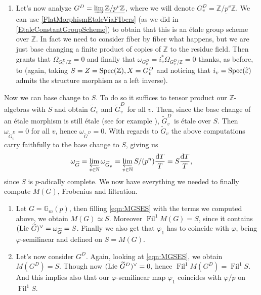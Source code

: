 \begin{ex}[]
\begin{enumerate}
	\item Let's now analyze $G^D = \varinjlim \underline{\mathbb{Z}/p^v\mathbb{Z}}$, where
		we will denote $G_v^D = \underline{\mathbb{Z}/p^v\mathbb{Z}}$.
		We can use \cref{FlatMorphismEtaleViaFIbers} (as we did in
		\cref{EtaleConstantGroupScheme}) to obtain that this is an étale
		group scheme over $\mathbb{Z}$.
		In fact we need to consider fiber by fiber what happens, but we are
		just base changing a finite product of copies of $\mathbb{Z}$ to the
		residue field.
		Then \cite[\href{https://stacks.math.columbia.edu/tag/00U0}{Section 00U0}]{SP}
		grants that $\Omega_{G_v^D/\mathbb{Z}} = 0$
		and finally that $\omega_{G_v^D} = i^*_v \Omega_{G^D_v/\mathbb{Z}} = 0$ thanks,
		as before, to
		\cite[\href{https://stacks.math.columbia.edu/tag/0474}{Lemma 0474}]{SP}
		(again, taking $S = Z = \operatorname{Spec}(\mathbb{Z}), X = G_v^D$
		and noticing that $i_v = \operatorname{Spec}(\widetilde{\varepsilon})$ admits the structure morphism
		as a left inverse).
\end{enumerate}
	Now we can base change to $S$.
	To do so it suffices to tensor product our $\mathbb{Z}$-algebras
	with $S$ and obtain $\widetilde{G}_v$ and $\widetilde{G}_v^D$ for all $v$.
	Then, since the base change of an étale morphism is still étale (see for example
	\cite[\href{https://stacks.math.columbia.edu/tag/02GO}{Lemma 02GO}]{SP}),
	$\widetilde{G}_v^D$ is étale over $S$.
	Then $\omega_{\widetilde{G}_v^D} = 0$ for all $v$,
	hence $\omega_{\widetilde{G}^D} = 0$.
	With regards to $\widetilde{G}_v$ the above computations carry faithfully
	to the base change to $S$, giving us
	\begin{equation*}
	\omega_{\widetilde{G}} = \varprojlim_{v \in \mathbb{N}} \omega_{\widetilde{G}_v} =
	\varprojlim_{v \in \mathbb{N}} S/ (p^n) \frac{ \mathrm{d}T }{ T } = S \frac{ \mathrm{d}T }{ T }
	,\end{equation*}
	since $S$ is $p$-adically complete.
	We now have everything we needed to finally compute $M(G)$, Frobenius and filtration.
\begin{enumerate}
	\item Let $G = \mathbb{G}_m(p)$, then filling \cref{eqn:MGSES} with
		the terms we computed above, we obtain $M(G) \simeq S$.
		Moreover $\operatorname{Fil}^1 M(G) = S$, since it contains
		$(\operatorname{Lie}\, \widetilde{G})^\vee = \omega_{\widetilde{G}} = S$.
		Finally we also get that $\varphi_1$ has to coincide with $\varphi$,
		being $\varphi$-semilinear and defined on $S = M(G)$.

	\item Let's now consider $G^D$.
		Again, looking at \cref{eqn:MGSES}, we obtain $M(G^D) = S$.
		Though now $(\operatorname{Lie}\, \widetilde{G}^D)^\vee = 0$,
		hence $\operatorname{Fil}^1 M(G^D) = \operatorname{Fil}^1 S$.
		And this implies also that our $\varphi$-semilinear map
		$\varphi_1$ coincides with $\varphi/p$ on $\operatorname{Fil}^1S$.
\end{enumerate}
\end{ex}
